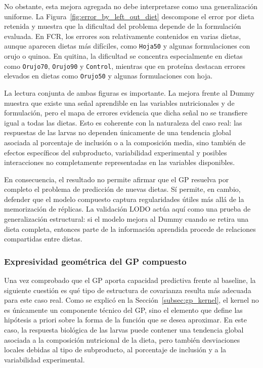 No obstante, esta mejora agregada no debe interpretarse como una generalización uniforme. La Figura~\ref{fig:error_by_left_out_diet} descompone el error por dieta retenida y muestra que la dificultad del problema depende de la formulación evaluada. En FCR, los errores son relativamente contenidos en varias dietas, aunque aparecen dietas más difíciles, como \texttt{Hoja50} y algunas formulaciones con orujo o quinoa. En quitina, la dificultad se concentra especialmente en dietas como \texttt{Orujo70}, \texttt{Orujo90} y \texttt{Control}, mientras que en proteína destacan errores elevados en dietas como \texttt{Orujo50} y algunas formulaciones con hoja.

La lectura conjunta de ambas figuras es importante. La mejora frente al Dummy muestra que existe una señal aprendible en las variables nutricionales y de formulación, pero el mapa de errores evidencia que dicha señal no se transfiere igual a todas las dietas. Esto es coherente con la naturaleza del caso real: las respuestas de las larvas no dependen únicamente de una tendencia global asociada al porcentaje de inclusión o a la composición media, sino también de efectos específicos del subproducto, variabilidad experimental y posibles interacciones no completamente representadas en las variables disponibles.

En consecuencia, el resultado no permite afirmar que el GP resuelva por completo el problema de predicción de nuevas dietas. Sí permite, en cambio, defender que el modelo compuesto captura regularidades útiles más allá de la memorización de réplicas. La validación LODO actúa aquí como una prueba de generalización estructural: si el modelo mejora al Dummy cuando se retira una dieta completa, entonces parte de la información aprendida procede de relaciones compartidas entre dietas.

\subsubsection{Expresividad geométrica del GP compuesto}
\label{subsubsec:expresividad_gp_compuesto}

Una vez comprobado que el GP aporta capacidad predictiva frente al baseline, la siguiente cuestión es qué tipo de estructura de covarianza resulta más adecuada para este caso real. Como se explicó en la Sección~\ref{subsec:gp_kernel}, el kernel no es únicamente un componente técnico del GP, sino el elemento que define las hipótesis a priori sobre la forma de la función que se desea aproximar. En este caso, la respuesta biológica de las larvas puede contener una tendencia global asociada a la composición nutricional de la dieta, pero también desviaciones locales debidas al tipo de subproducto, al porcentaje de inclusión y a la variabilidad experimental.

